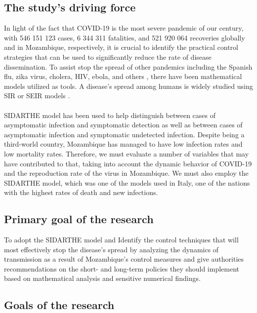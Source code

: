 \documentclass{article}
\begin{document}
\subsection{The study's driving force}
In light of the fact that COVID-19 is the most severe pandemic of our century, with 546 151 123 cases, 6 344 311 fatalities, and 521 920 064 recoveries globally and in Mozambique, respectively, it is crucial to identify the practical control strategies that can be used to significantly reduce the rate of disease dissemination. To assist stop the spread of other pandemics including the Spanish flu, zika virus, cholera, HIV, ebola, and others \citep{regina2021review}, there have been mathematical models utilized as tools. A disease's spread among humans is widely studied using SIR or SEIR models \citep{ogren2002vaccination}.\\\\ SIDARTHE \citep{giordano2020modelling} model has been used to help distinguish between cases of asymptomatic infection and symptomatic detection as well as between cases of asymptomatic infection and symptomatic undetected infection.
Despite being a third-world country, Mozambique has managed to have low infection rates and low mortality rates. Therefore, we must evaluate a number of variables that may have contributed to that, taking into account the dynamic behavior of COVID-19 and the reproduction rate of the virus in Mozambique. We must also employ the SIDARTHE model, which was one of the models used in Italy, one of the nations with the highest rates of death and new infections. 

\subsection{Primary goal of the research}
To adopt the SIDARTHE model and Identify the control techniques that will most effectively stop the disease's spread by analyzing the dynamics of transmission as a result of Mozambique's control measures and give authorities recommendations on the short- and long-term policies they should implement based on mathematical analysis and sensitive numerical findings.

\subsection{Goals of the research}
\end{document}
